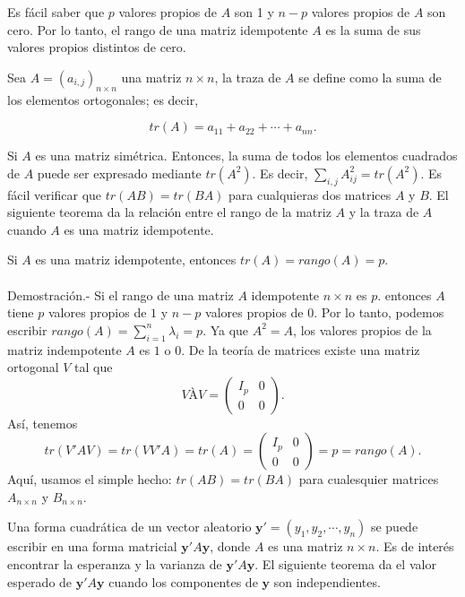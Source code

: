 Es fácil saber que $p$ valores propios de $A$ son 1 y $n - p$ valores propios de $A$ son cero. Por lo tanto, el rango de una matriz idempotente $A$ es la suma de sus valores propios distintos de cero.

\begin{def.}
    Sea $A=(a_{i,j})_{n\times n}$ una matriz $n\times n$, la traza de $A$ se define como la suma de los elementos ortogonales; es decir,

    $$tr(A)=a_{11}+a_{22}+\cdots+a_{nn}.$$
\end{def.}

Si $A$ es una matriz simétrica. Entonces, la suma de todos los elementos cuadrados de $A$ puede ser expresado mediante $tr\left(A^2\right)$. Es decir, $\sum_{i,j}A_{ij}^2=tr\left(A^2\right).$ Es fácil verificar que $tr(AB)=tr(BA)$ para cualquieras dos matrices $A$ y $B$. El siguiente teorema da la relación entre el rango de la matriz $A$ y la traza de $A$ cuando $A$ es una matriz idempotente.

\begin{teo}
    Si $A$ es una matriz idempotente, entonces $tr(A)=rango(A)=p.$\\\\
	Demostración.-\; Si el rango de una matriz $A$ idempotente $n\times n$ es $p$. entonces $A$ tiene $p$ valores propios de $1$ y $n-p$ valores propios de $0$. Por lo tanto, podemos escribir $rango(A)=\sum_{i=1}^n\lambda_i=p$. Ya que $A^2=A$, los valores propios de la matriz indempotente $A$ es $1$ o $0$. De la teoría de matrices existe una matriz ortogonal $V$ tal que
	$$
	VÀV=
	\left(
	    \begin{array}{cc}
		I_p & 0 \\
		0 & 0
	    \end{array}
	\right).
	$$
	Así, tenemos
	$$tr(V'AV)=tr(VV'A)=tr(A)= 
	\left(
	    \begin{array}{cc}
		I_p & 0 \\
		0 & 0
	    \end{array}
	\right)
	=p=rango(A).
	$$
	Aquí, usamos el simple hecho: $tr(AB)=tr(BA)$ para cualesquier matrices $A_{n\times n}$ y $B_{n\times n}$.
\end{teo}

Una forma cuadrática de un vector aleatorio $\textbf{y}' = (y_1 , y_2 , \cdots , y_n)$ se puede escribir en una forma matricial $\textbf{y}'A\textbf{y}$, donde $A$ es una matriz $n \times n$. Es de interés encontrar la esperanza y la varianza de $\textbf{y}'A\textbf{y}$. El siguiente teorema da  el valor esperado de $\textbf{y}'A\textbf{y}$ cuando los componentes de $\textbf{y}$ son independientes.

